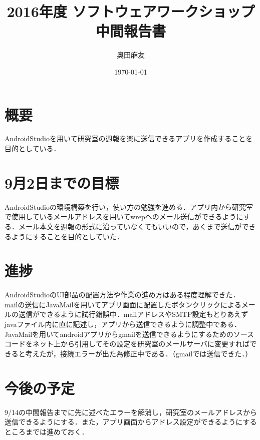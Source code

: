 \documentclass[a4j]{jarticle}
\title{2016年度 ソフトウェアワークショップ中間報告書}
\author{奥田麻友}
\date{\today}
\begin{document}
\maketitle
\section{概要}
AndroidStudioを用いて研究室の週報を楽に送信できるアプリを作成することを目的としている．

\section{9月2日までの目標}
AndroidStudioの環境構築を行い，使い方の勉強を進める．アプリ内から研究室で使用しているメールアドレスを用いてwrepへのメール送信ができるようにする．メール本文を週報の形式に沿っていなくてもいいので，あくまで送信ができるようにすることを目的としていた．

\section{進捗}
AndroidStudioのUI部品の配置方法や作業の進め方はある程度理解できた．\\
mailの送信にJavaMailを用いてアプリ画面に配置したボタンクリックによるメールの送信ができるように試行錯誤中．mailアドレスやSMTP設定もとりあえずjavaファイル内に直に記述し，アプリから送信できるように調整中である．JavaMailを用いてandroidアプリからgmailを送信できるようにするためのソースコードをネット上から引用してその設定を研究室のメールサーバに変更すればできると考えたが，接続エラーが出た為修正中である．（gmailでは送信できた．）


\section{今後の予定}
9/14の中間報告までに先に述べたエラーを解消し，研究室のメールアドレスから送信できるようにする．また，アプリ画面からアドレス設定ができるようにするところまでは進めておく．
\end{document}
